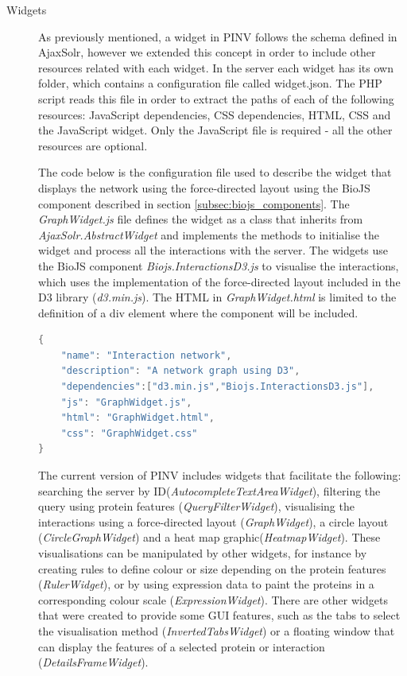 \begin{description}
\item[Widgets]
As previously mentioned, a widget in PINV follows the schema defined in AjaxSolr, however we extended this concept in order to include other resources related with each widget. In the server each widget has its own folder, which contains a configuration file called widget.json. The PHP script reads this file in order to extract the paths of each of the following resources: JavaScript dependencies, CSS dependencies, HTML, CSS and the JavaScript widget. Only the JavaScript file is required - all the other resources are optional. 

The code below is the configuration file used to describe the widget that displays the network using the force-directed layout using the BioJS component described in section \ref{subsec:biojs_components}. The \emph{GraphWidget.js} file defines the widget as a class that inherits from \emph{AjaxSolr.AbstractWidget} and implements the methods to initialise the widget and process all the interactions with the server. The widgets use the BioJS component \emph{Biojs.InteractionsD3.js} to visualise the interactions, which uses the implementation of the force-directed layout included in the D3 library (\emph{d3.min.js}). The HTML in \emph{GraphWidget.html} is limited to the definition of a div element where the component will be included.

\begin{lstlisting}[language=java]
{
    "name": "Interaction network",
    "description": "A network graph using D3",
    "dependencies":["d3.min.js","Biojs.InteractionsD3.js"],
    "js": "GraphWidget.js",
    "html": "GraphWidget.html",
    "css": "GraphWidget.css"
} 
\end{lstlisting}

The current version of PINV includes widgets that facilitate the following: searching the server by ID(\emph{AutocompleteTextAreaWidget}), filtering the query using protein features (\emph{QueryFilterWidget}), visualising the interactions using a force-directed layout (\emph{GraphWidget}), a circle layout (\emph{CircleGraphWidget}) and a heat map graphic(\emph{HeatmapWidget}). These visualisations can be manipulated by other widgets, for instance by creating rules to define colour or size  depending on the protein features (\emph{RulerWidget}), or by using expression data to paint the proteins in a corresponding colour scale (\emph{ExpressionWidget}). There are other widgets that were created to provide some GUI features, such as the tabs to select the visualisation method (\emph{InvertedTabsWidget}) or a floating window that can display the features of a selected protein or interaction (\emph{DetailsFrameWidget}).


\end{description}
